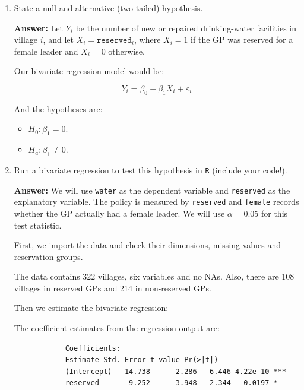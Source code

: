 \documentclass[12pt,letterpaper]{article}
\begin{document}
	\begin{enumerate}
		\item [(a)] State a null and alternative (two-tailed) hypothesis.
		
		\vspace{.25cm}
		\textbf{Answer:} Let $Y_i$ be the number of new or repaired drinking-water
		facilities in village $i$, and let $X_i=\texttt{reserved}_i$, where $X_i=1$
		if the GP was reserved for a female leader and $X_i=0$ otherwise.
		
		Our bivariate regression model would be:
		
		$$Y_i=\beta_0+\beta_1X_i+\varepsilon_i$$
		
		And the hypotheses are:
		\begin{itemize}
			\item $H_0:\beta_1=0$.
			\item $H_a:\beta_1\neq0$.
		\end{itemize}
		
		\vspace{.25cm}
		\item [(b)] Run a bivariate regression to test this hypothesis in \texttt{R}
		(include your code!).
		
		\vspace{.25cm}
		\textbf{Answer:} We will use \texttt{water} as the dependent variable and
		\texttt{reserved} as the explanatory variable. The policy is measured by
		\texttt{reserved} and \texttt{female} records whether the GP actually had a female leader. We will use $\alpha=0.05$ for this test statistic.
		
		First, we import the data and check their dimensions, missing values and
		reservation groups.
		
		
		
		The data contains 322 villages, six variables and no NAs. Also, there are 108 villages in reserved GPs and 214 in non-reserved GPs.
		
		\vspace{.25cm}
		Then we estimate the bivariate regression:
		
		
		
		The coefficient estimates from the regression output are:
		
		\begin{verbatim}
			Coefficients:
			Estimate Std. Error t value Pr(>|t|)    
			(Intercept)   14.738      2.286   6.446 4.22e-10 ***
			reserved       9.252      3.948   2.344   0.0197 *  
		\end{verbatim}
		

\end{enumerate}
\end{document}
